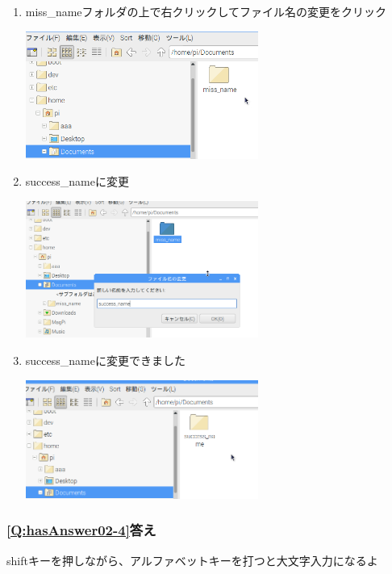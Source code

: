 \documentclass[a4paper,12pt]{jarticle}
\begin{document}
\begin{enumerate}
  \item
        miss\_nameフォルダの上で右クリックしてファイル名の変更をクリック

        \centering
        \includegraphics[width=0.6\textwidth]{textbook-img214.png}
        \flushleft

  \item success\_nameに変更

        \centering
        \includegraphics[width=0.6\textwidth]{textbook-img215.png}
        \flushleft
  \item success\_nameに変更できました

        \centering
        \includegraphics[width=0.6\textwidth]{textbook-img216.png}
        \flushleft
\end{enumerate}



\subsubsection{\bfseries
\ref*{Q:hasAnswer02-4}答え}

shiftキーを押しながら、アルファベットキーを打つと大文字入力になるよ
\end{document}
